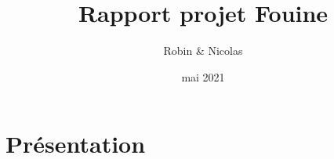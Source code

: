 \documentclass{article}
\title{Rapport projet Fouine}
\author{Robin \bsc{Jourde} \& Nicolas \bsc{Nardino}}
\date{mai 2021}
\begin{document}
\maketitle

\begin{center}
  \footnotesize
  
\end{center}


\tableofcontents

\section{Présentation}

\cite{Landin66}

 \cite{Tchana21}




\end{document}
